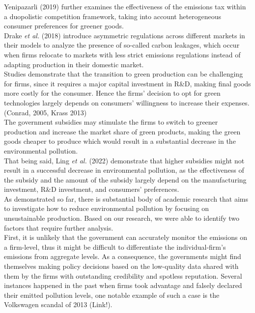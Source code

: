 \documentclass{article}
\begin{document}
Yenipazarli (2019) further examines the effectiveness of the emissions tax within a duopolistic competition framework, taking into account heterogeneous consumer preferences for greener goods.\\ 

Drake \textit{et al.} (2018) introduce asymmetric regulations across different markets in their models to analyze the presence of so-called carbon leakages, which occur when firms relocate to markets with less strict emissions regulations instead of adapting production in their domestic market.\\

Studies demonstrate that the transition to green production can be challenging for firms, since it requires a major capital investment in R\&D, making final goods more costly for the consumer. Hence the firms’ decision to opt for green technologies largely depends on consumers’ willingness to increase their expenses. (Conrad, 2005, Krass 2013) \\ 

The government subsidies may stimulate the firms to switch to greener production and increase the market share of green products, making the green goods cheaper to produce which would result in a substantial decrease in the environmental pollution.\\

That being said, Ling \textit{et al.} (2022) demonstrate that higher subsidies might not result in a successful decrease in environmental pollution, as the effectiveness of the subsidy and the amount of the subsidy largely depend on the manufacturing investment, R\&D investment, and consumers' preferences. \\

As demonstrated so far, there is substantial body of academic research that aims to investigate how to reduce environmental pollution by focusing on unsustainable production. Based on our research, we were able to identify two factors that require further analysis. \\

First, it is unlikely that the government can accurately monitor the emissions on a firm-level, thus it might be difficult to differentiate the individual-firm's emissions from aggregate levels. As a consequence, the governments might find themselves making policy decisions based on the low-quality data shared with them by the firms with outstanding credibility and spotless reputation. Several instances happened in the past when firms took advantage and falsely declared their emitted pollution levels, one notable example of such a case is the Volkswagen scandal of 2013 (Link!). \\
\end{document}
